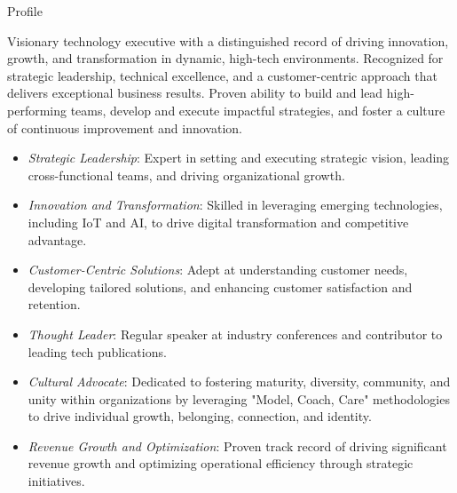 \documentclass{resume} %
\begin{document}
\vspace{-1em}
\begin{rSection}{Profile}
  
  Visionary technology executive with a distinguished record of driving innovation, growth, and transformation in dynamic, high-tech environments. Recognized for strategic leadership, technical excellence, and a customer-centric approach that delivers exceptional business results. Proven ability to build and lead high-performing teams, develop and execute impactful strategies, and foster a culture of continuous improvement and innovation.

  \begin{itemize}
    \setlength\itemsep{-0.5em}
    \item \textit{Strategic Leadership}: Expert in setting and executing strategic vision, leading cross-functional teams, and driving organizational growth.
    \item \textit{Innovation and Transformation}: Skilled in leveraging emerging technologies, including IoT and AI, to drive digital transformation and competitive advantage.
    \item \textit{Customer-Centric Solutions}: Adept at understanding customer needs, developing tailored solutions, and enhancing customer satisfaction and retention.
    \item \textit{Thought Leader}: Regular speaker at industry conferences and contributor to leading tech publications.
    \item \textit{Cultural Advocate}: Dedicated to fostering maturity, diversity, community, and unity within organizations by leveraging "Model, Coach, Care" methodologies to drive individual growth, belonging, connection, and identity.
    \item \textit{Revenue Growth and Optimization}: Proven track record of driving significant revenue growth and optimizing operational efficiency through strategic initiatives.
  \end{itemize}
  
\end{rSection}


\end{document}
